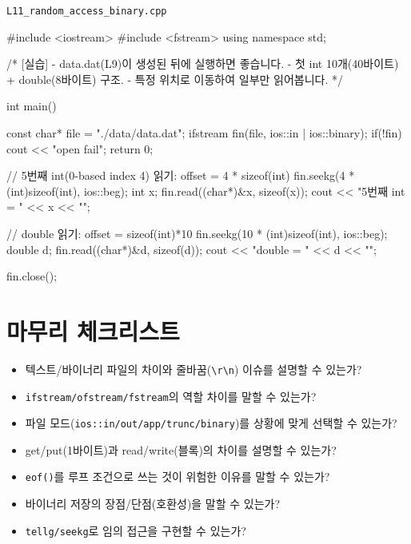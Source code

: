 \documentclass[11pt,a4paper]{article}
\newcommand{\filetag}[1]{\texttt{\color{Accent}#1}}
\begin{document}
\noindent\filetag{L11\_random\_access\_binary.cpp}
\begin{cppcode}
#include <iostream>
#include <fstream>
using namespace std;

/*
[실습]
- data.dat(L9)이 생성된 뒤에 실행하면 좋습니다.
- 첫 int 10개(40바이트) + double(8바이트) 구조.
- 특정 위치로 이동하여 일부만 읽어봅니다.
*/

int main() {
    const char* file = "./data/data.dat";
    ifstream fin(file, ios::in | ios::binary);
    if(!fin) { cout << "open fail\n"; return 0; }

    // 5번째 int(0-based index 4) 읽기: offset = 4 * sizeof(int)
    fin.seekg(4 * (int)sizeof(int), ios::beg);
    int x;
    fin.read((char*)&x, sizeof(x));
    cout << "5번째 int = " << x << "\n";

    // double 읽기: offset = sizeof(int)*10
    fin.seekg(10 * (int)sizeof(int), ios::beg);
    double d;
    fin.read((char*)&d, sizeof(d));
    cout << "double = " << d << "\n";

    fin.close();
}
\end{cppcode}

\section*{마무리 체크리스트}
\begin{GoalBox}
\begin{itemize}[leftmargin=18pt]
  \item 텍스트/바이너리 파일의 차이와 줄바꿈(\texttt{\textbackslash r\textbackslash n}) 이슈를 설명할 수 있는가?
  \item \texttt{ifstream/ofstream/fstream}의 역할 차이를 말할 수 있는가?
  \item 파일 모드(\texttt{ios::in/out/app/trunc/binary})를 상황에 맞게 선택할 수 있는가?
  \item get/put(1바이트)과 read/write(블록)의 차이를 설명할 수 있는가?
  \item \texttt{eof()}를 루프 조건으로 쓰는 것이 위험한 이유를 말할 수 있는가?
  \item 바이너리 저장의 장점/단점(호환성)을 말할 수 있는가?
  \item \texttt{tellg/seekg}로 임의 접근을 구현할 수 있는가?
\end{itemize}
\end{GoalBox}
\end{document}

